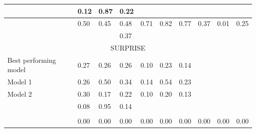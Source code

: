 \documentclass[11pt]{article}
\begin{document}
\begin{table}[!htbp]
\begin{tabular}{|l|l|l|l|l|l|l|l|l|l|}
\hline
    \tiny{\cite{strapparava2008learning} } &
    \footnotesize{0.12} & 
    \footnotesize{0.87} & 
    \footnotesize{0.22} &
    &
    &
    &
    &
    &
    \\

\hline
    \tiny{\cite{kim2010evaluation} } &
    \footnotesize{0.50} & 
    \footnotesize{0.45} & 
    \footnotesize{0.48} &
    \footnotesize{0.71} & 
    \footnotesize{0.82} & 
    \footnotesize{0.77} &
    \footnotesize{0.37} & 
    \footnotesize{0.01} & 
    \footnotesize{0.25} \\

\hline
    \tiny{\cite{danisman2008feeler}} &
    \footnotesize{} & 
    \footnotesize{} & 
    \footnotesize{0.37} &
    \footnotesize{} & 
    \footnotesize{} & 
    \footnotesize{} &
    \footnotesize{} & 
    \footnotesize{} & 
    \footnotesize{} \\

\hline
    \multicolumn{10}{|c|}{{SURPRISE}} \\                               
    
\hline
  \tiny{Best performing model} & 
  \footnotesize{0.27} & 
  \footnotesize{0.26} & 
  \footnotesize{0.26} & 
  \footnotesize{0.10} & 
  \footnotesize{0.23} & 
  \footnotesize{0.14} & 
  \footnotesize{} & 
  \footnotesize{} & 
  \footnotesize{} \\ 

\hline
    \tiny{Model 1} & 
    \footnotesize{0.26} & 
    \footnotesize{0.50} & 
    \footnotesize{0.34} & 
    \footnotesize{0.14} & 
    \footnotesize{0.54} & 
    \footnotesize{0.23} & 
    \footnotesize{} & 
    \footnotesize{} & 
    \footnotesize{} \\ 

\hline
    \tiny{Model 2} & 
    \footnotesize{0.30} & 
    \footnotesize{0.17} & 
    \footnotesize{0.22} & 
    \footnotesize{0.10} & 
    \footnotesize{0.20} & 
    \footnotesize{0.13} & 
    \footnotesize{} & 
    \footnotesize{} & 
    \footnotesize{} \\ 


\hline
    \tiny{\cite{strapparava2008learning} } &
    \footnotesize{0.08} & 
    \footnotesize{0.95} & 
    \footnotesize{0.14} &
    &
    &
    &
    &
    &
    \\

\hline
    \tiny{\cite{kim2010evaluation} } &
    & 
    & 
    &
    &
    &
    &
    &
    &
    \\
    
\hline
    \tiny{\cite{danisman2008feeler} } &
    \footnotesize{0.00} & 
    \footnotesize{0.00} & 
    \footnotesize{0.00} &
    \footnotesize{0.00} & 
    \footnotesize{0.00} & 
    \footnotesize{0.00} &
    \footnotesize{0.00} & 
    \footnotesize{0.00} & 
    \footnotesize{0.00} \\


\end{tabular}
\end{table}
\end{document}
